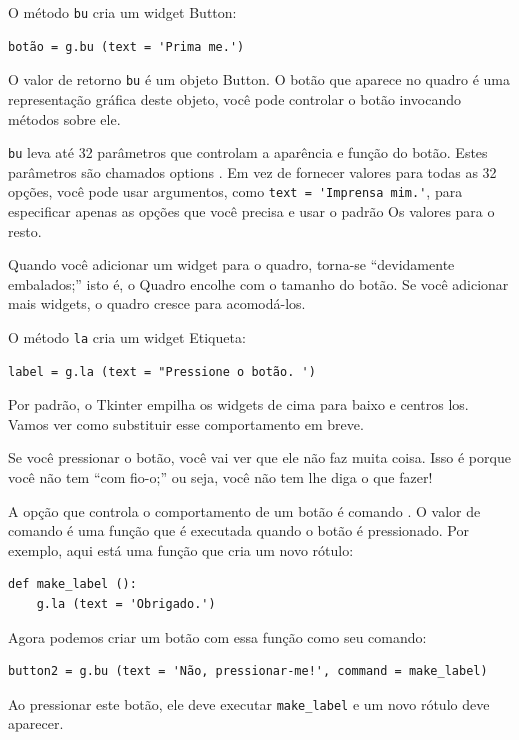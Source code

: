 \documentclass[10pt]{book}
\begin{document}
\begin{exercise}
\begin{v erbatim}
O método {\tt bu} cria um widget Button:

\begin{verbatim}
botão = g.bu (text = 'Prima me.')
\end{verbatim}
%
O valor de retorno {\tt bu} é um objeto Button. O botão
que aparece no quadro é uma representação gráfica deste
objeto, você pode controlar o botão invocando métodos sobre ele.

{\tt bu} leva até 32 parâmetros que controlam a aparência
e função do botão. Estes parâmetros são chamados
{options \bf}. Em vez de fornecer valores para todas as 32 opções,
você pode usar argumentos, como \verb "text = 'Imprensa mim.'",
para especificar apenas as opções que você precisa e usar o padrão
Os valores para o resto.

Quando você adicionar um widget para o quadro, torna-se ``devidamente embalados;''
isto é, o Quadro encolhe com o tamanho do botão. Se você
adicionar mais widgets, o quadro cresce para acomodá-los.

O método {\tt la} cria um widget Etiqueta:

\begin{verbatim}
label = g.la (text = "Pressione o botão. ')
\end{verbatim}
%
Por padrão, o Tkinter empilha os widgets de cima para baixo e centros
los. Vamos ver como substituir esse comportamento em breve.

Se você pressionar o botão, você vai ver que ele não faz muita coisa.
Isso é porque você não tem ``com fio-o;'' ou seja, você não tem
lhe diga o que fazer!

A opção que controla o comportamento de um botão é {comando \tt}.
O valor de {comando \tt} é uma função que é executada quando
o botão é pressionado. Por exemplo, aqui está uma função que cria
um novo rótulo:

\begin{verbatim}
def make_label ():
    g.la (text = 'Obrigado.')
\end{verbatim}
%
Agora podemos criar um botão com essa função como seu comando:

\begin{verbatim}
button2 = g.bu (text = 'Não, pressionar-me!', command = make_label)
\end{verbatim}
%
Ao pressionar este botão, ele deve executar \verb "make_label"
e um novo rótulo deve aparecer.


\end{v erbatim}
\end{exercise}
\end{document}
